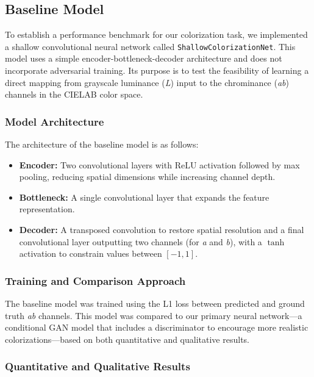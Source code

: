 \documentclass{article} %
\begin{document}
\subsection{Baseline Model}

To establish a performance benchmark for our colorization task, we implemented a shallow convolutional neural network called \texttt{ShallowColorizationNet}. This model uses a simple 
encoder-bottleneck-decoder architecture and does not incorporate adversarial training. Its purpose is to test the feasibility of learning a direct mapping from grayscale luminance (\textit{L}) 
input to the chrominance (\textit{ab}) channels in the CIELAB color space.

\subsubsection{Model Architecture}

The architecture of the baseline model is as follows:
\begin{itemize}
    \item \textbf{Encoder:} Two convolutional layers with ReLU activation followed by max pooling, reducing spatial dimensions while increasing channel depth.
    \item \textbf{Bottleneck:} A single convolutional layer that expands the feature representation.
    \item \textbf{Decoder:} A transposed convolution to restore spatial resolution and a final convolutional layer outputting two channels (for \textit{a} and \textit{b}), with a $\tanh$ 
    activation to constrain values between $[-1, 1]$.
\end{itemize}

\subsubsection{Training and Comparison Approach}

The baseline model was trained using the L1 loss between predicted and ground truth \textit{ab} channels. This model was compared to our primary neural network—a conditional 
GAN model that includes a discriminator to encourage more realistic colorizations—based on both quantitative and qualitative results.

\subsubsection{Quantitative and Qualitative Results}
\end{document}
